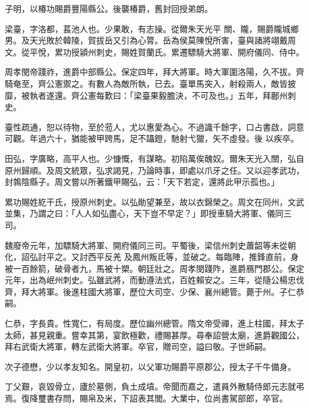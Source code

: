 \begin{pinyinscope}
 子明，以椿功賜爵豐陽縣公。後襲椿爵，舊封回授弟朗。



 梁臺，字洛都，萇池人也。少果敢，有志操。從爾朱天光平
 關、隴，賜爵隴城鄉男。及天光敗於韓陵，賀拔岳又引為心膂。岳為侯莫陳悅所害，臺與諸將翊戴周文。從平悅，累功授潁州刺史，賜姓賀蘭氏。累遷驃騎大將軍、開府儀同、侍中。



 周孝閔帝踐祚，進爵中部縣公。保定四年，拜大將軍。時大軍圍洛陽，久不拔。齊騎奄至，齊公憲禦之。有數人為敵所執，已去。臺單馬突入，射殺兩人，敵皆披靡，被執者遂還。齊公憲每歎曰：「梁臺果毅膽決，不可及也。」五年，拜鄜州刺史。



 臺性疏通，恕以待物，至於蒞人，尤以惠愛為心。不過識千餘字，口占書啟，詞意可觀。年過六十，猶能被甲跨馬，足不躡鐙，馳射弋獵，矢不虛發。後
 以疾卒。



 田弘，字廣略，高平人也。少慷慨，有謀略。初陷萬俟醜奴。爾朱天光入關，弘自原州歸順。及周文統眾，弘求謁見，乃論時事，即處以爪牙之任。又以迎孝武功，封鶉陰縣子。周文嘗以所著鐵甲賜弘，云：「天下若定，還將此甲示孤也。」



 累功賜姓紇干氏，授原州刺史。以弘勛望兼至，故以衣錦榮之。周文在同州，文武並集，乃謂之曰：「人人如弘盡心，天下豈不早定？」即授車騎大將軍、儀同三司。



 魏廢帝元年，加驃騎大將軍、開府儀同三司。平蜀後，梁信州刺史蕭韶等未從朝化，詔弘討平之。又討西平反羌
 及鳳州叛氐等，並破之。每臨陣，推鋒直前，身被一百餘箭，破骨者九，馬被十槊。朝廷壯之。周孝閔踐阼，進爵鴈門郡公。保定元年，出為岷州刺史。弘雖武將，而動遵法式，百姓賴安之。三年，從隨公楊忠伐齊，拜大將軍。後進柱國大將軍，歷位大司空、少保、襄州總管。薨于州。子仁恭嗣。



 仁恭，字長貴。性寬仁，有局度。歷位幽州總管。隋文帝受禪，進上柱國，拜太子太師，甚見親重。嘗幸其第，宴飲極歡，禮賜甚厚。尋奉詔營太廟，進爵觀國公，拜右武衛大將軍，轉左武衛大將軍。卒官，贈司空，謚曰敬。子世師嗣。



 次子德懋，少以孝友知名。開皇初，以父軍功賜爵平原郡公，授太子千牛備身。



 丁父艱，哀毀骨立，廬於墓側，負土成墳。帝聞而嘉之，遣員外散騎侍郎元志就弔焉。復降璽書存問，賜帛及米，下詔表其閭。大業中，位尚書駕部郎，卒官。




\end{pinyinscope}
